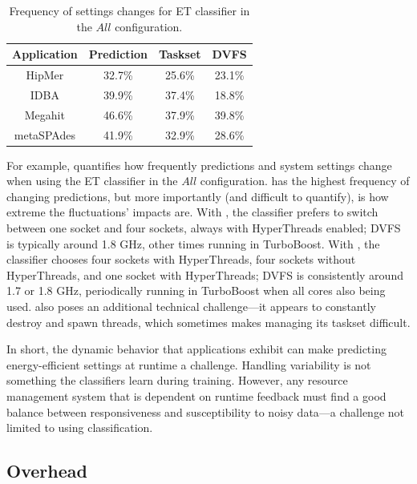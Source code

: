 \begin{table}[t]
\caption{Frequency of settings changes for ET classifier in the $All$ configuration.}
\label{tbl:classifiers-actuation}
\small
\centering
\begin{tabular}{c|c|c|c}
  \textbf{Application} & \textbf{Prediction} & \textbf{Taskset} & \textbf{DVFS} \\
  \hline
  HipMer     & 32.7\% & 25.6\% & 23.1\% \\
  IDBA       & 39.9\% & 37.4\% & 18.8\% \\
  Megahit    & 46.6\% & 37.9\% & 39.8\% \\
  metaSPAdes & 41.9\% & 32.9\% & 28.6\% \\
  \hline
\end{tabular}
\end{table}

For example,  quantifies how frequently predictions and system settings change when using the ET classifier in the $All$ configuration.
 has the highest frequency of changing predictions, but more importantly (and difficult to quantify), is how extreme the fluctuations' impacts	 are.
With , the classifier prefers to switch between one socket and four sockets, always with HyperThreads enabled; DVFS is typically around 1.8 GHz, other times running in TurboBoost.
With , the classifier chooses four sockets with HyperThreads, four sockets without HyperThreads, and one socket with HyperThreads; DVFS is consistently around 1.7 or 1.8 GHz, periodically running in TurboBoost when all cores also being used.
 also poses an additional technical challenge---it appears to constantly destroy and spawn threads, which sometimes makes managing its taskset difficult.

In short, the dynamic behavior that applications exhibit can make predicting energy-efficient settings at runtime a challenge.
Handling variability is not something the classifiers learn during training.
However, any resource management system that is dependent on runtime feedback must find a good balance between responsiveness and susceptibility to noisy data---a challenge not limited to using classification.


\subsection{Overhead}
\label{sec:classifiers-eval-overhead}

